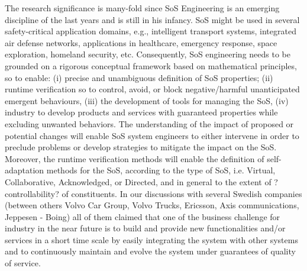 The
research significance is many-fold since SoS Engineering is an emerging discipline of the last years and is still in
his infancy. SoS might be used in several safety-critical application domains, e.g., intelligent transport systems,
integrated air defense networks, applications in healthcare, emergency response, space exploration, homeland
security, etc. Consequently, SoS engineering needs to be grounded on a rigorous conceptual framework based
on mathematical principles, so to enable: (i) precise and unambiguous definition of SoS properties; (ii) runtime
verification so to control, avoid, or block negative/harmful unanticipated emergent behaviours, (iii) the development
of tools for managing the SoS, (iv) industry to develop products and services with guaranteed properties
while excluding unwanted behaviors. The understanding of the impact of proposed or potential changes will
enable SoS system engineers to either intervene in order to preclude problems or develop strategies to mitigate
the impact on the SoS. Moreover, the runtime verification methods will enable the definition of self-adaptation
methods for the SoS, according to the type of SoS, i.e. Virtual, Collaborative, Acknowledged, or Directed, and
in general to the extent of ?controllability? of constituents.
In our discussions with several Swedish companies (between others Volvo Car Group, Volvo Trucks, Ericsson,
Axis communications, Jeppesen - Boing) all of them claimed that one of the business challenge for industry
in the near future is to build and provide new functionalities and/or services in a short time scale by easily integrating
the system with other systems and to continuously maintain and evolve the system under guarantees of
quality of service.



